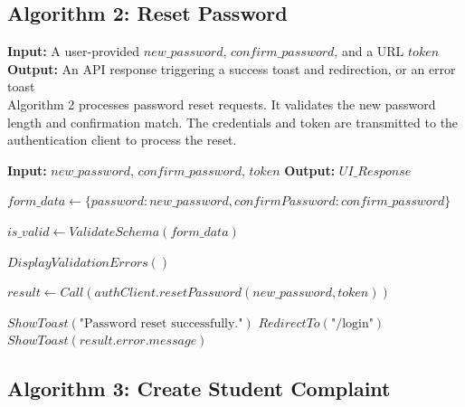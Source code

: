 \subsection{Algorithm 2: Reset Password}

\textbf{Input:} A user-provided $new\_password$, $confirm\_password$, and a URL $token$ \\
\textbf{Output:} An API response triggering a success toast and redirection, or an error toast \\

Algorithm 2 processes password reset requests. It validates the new password length and confirmation match. The credentials and token are transmitted to the authentication client to process the reset.

\begin{algorithm}[H]
\caption{Reset Password Process}
\begin{algorithmic}[1]

\State \textbf{Input:} $new\_password$, $confirm\_password$, $token$
\State \textbf{Output:} $UI\_Response$

    \State {}
    \State $form\_data \gets \{password: new\_password, confirmPassword: confirm\_password\}$

    \State {}
    \State $is\_valid \gets ValidateSchema(form\_data)$

        \State \Return $DisplayValidationErrors()$
    \EndIf

    \State {}
    \State $result \gets Call(authClient.resetPassword(new\_password, token))$

        \State $ShowToast(\text{"Password reset successfully."})$
        \State $RedirectTo(\text{"/login"})$
        \State \Return {}
    \Else
        \State {}
        \State $ShowToast(result.error.message)$
        \State \Return {}
    \EndIf

\EndFunction

\end{algorithmic}
\end{algorithm}


\subsection{Algorithm 3: Create Student Complaint}

